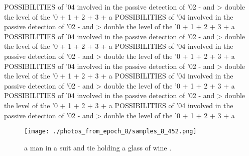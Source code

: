 \documentclass{article}%
\begin{document}
POSSIBILITIES of '04 involved in the passive detection of '02 {-} and > double the level of the '0 + 1 + 2 + 3 + a\newline%
POSSIBILITIES of '04 involved in the passive detection of '02 {-} and > double the level of the '0 + 1 + 2 + 3 + a\newline%
POSSIBILITIES of '04 involved in the passive detection of '02 {-} and > double the level of the '0 + 1 + 2 + 3 + a\newline%
POSSIBILITIES of '04 involved in the passive detection of '02 {-} and > double the level of the '0 + 1 + 2 + 3 + a\newline%
POSSIBILITIES of '04 involved in the passive detection of '02 {-} and > double the level of the '0 + 1 + 2 + 3 + a\newline%
POSSIBILITIES of '04 involved in the passive detection of '02 {-} and > double the level of the '0 + 1 + 2 + 3 + a\newline%
POSSIBILITIES of '04 involved in the passive detection of '02 {-} and > double the level of the '0 + 1 + 2 + 3 + a\newline%
POSSIBILITIES of '04 involved in the passive detection of '02 {-} and > double the level of the '0 + 1 + 2 + 3 + a\newline%

%


\begin{figure}[h!]%
\centering%
\texttt{[image: ./photos\_from\_epoch\_8/samples\_8\_452.png]}%
\caption{a man in a suit and tie holding a glass of wine .}%
\end{figure}

%
\end{document}
